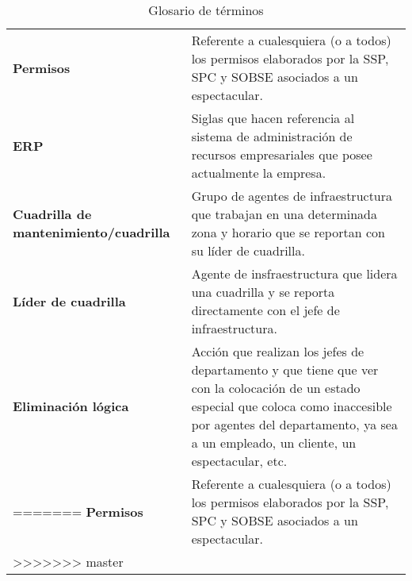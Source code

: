 \begin{longtable}[H]{m{4cm}m{8cm}}
\textbf{Permisos} & Referente a cualesquiera (o a todos) los permisos elaborados por la SSP, SPC y SOBSE asociados a un espectacular. \tabularnewline

\textbf{ERP} & Siglas que hacen referencia al sistema de administración de recursos empresariales que posee actualmente la empresa. \tabularnewline

\textbf{Cuadrilla de mantenimiento/cuadrilla} & Grupo de agentes de infraestructura que trabajan en una determinada zona y horario que se reportan con su líder de cuadrilla. \tabularnewline

\textbf{Líder de cuadrilla} & Agente de insfraestructura que lidera una cuadrilla y se reporta directamente con el jefe de infraestructura. \tabularnewline

\textbf{Eliminación lógica} & Acción que realizan los jefes de departamento y que tiene que ver con la colocación de un estado especial que coloca como inaccesible por agentes del departamento, ya sea a un empleado, un cliente, un espectacular, etc. \tabularnewline

\label{tbl:glosario}
    \caption{Glosario de términos}
    \bottomrule
=======
\textbf{Permisos} & Referente a cualesquiera (o a todos) los permisos elaborados por la SSP, SPC y SOBSE asociados a un espectacular. \tabularnewline
\bottomrule

\caption{Glosario de términos}
\label{tbl:glosario}
>>>>>>> master
\end{longtable}